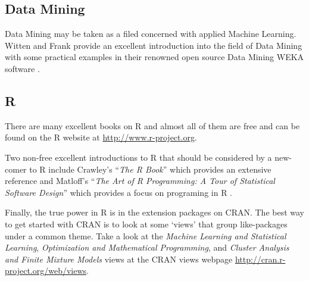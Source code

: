 \subsection{Data Mining}
Data Mining may be taken as a filed concerned with applied Machine Learning. 
Witten and Frank provide an excellent introduction into the field of Data Mining with some practical examples in their renowned open source Data Mining WEKA software \cite{Witten2011}.

\subsection{R}
There are many excellent books on R and almost all of them are free and can be found on the R website at \url{http://www.r-project.org}.

Two non-free excellent introductions to R that should be considered by a new-comer to R include Crawley's ``\emph{The R Book}'' which provides an extensive reference \cite{Crawley2007} and Matloff's ``\emph{The Art of R Programming: A Tour of Statistical Software Design}'' which provides a focus on programing in R \cite{Matloff2011}.

Finally, the true power in R is in the extension packages on CRAN. The best way to get started with CRAN is to look at some `views' that group like-packages under a common theme. Take a look at the \emph{Machine Learning and Statistical Learning}, \emph{Optimization and Mathematical Programming}, and \emph{Cluster Analysis and Finite Mixture Models} views at the CRAN views webpage \url{http://cran.r-project.org/web/views}.

